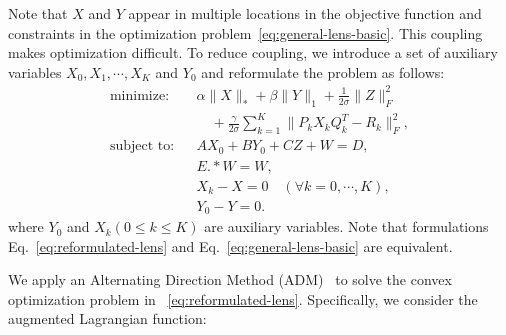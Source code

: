  Note that $X$ and $Y$ appear in
multiple locations in the objective function and constraints in the
optimization problem~\ref{eq:general-lens-basic}. This coupling makes
optimization difficult. To reduce coupling, we introduce a set of
auxiliary variables $X_0,X_1,\cdots,X_{K}$ and $Y_0$ and reformulate
the problem as follows:
\begin{eqnarray}
\text{minimize:}  && \alpha \|X\|_* + \beta \|Y\|_1 +
\frac{1}{2\sigma}\|Z\|_F^2 \nonumber\\
                  && \quad+\frac{\gamma}{2\sigma}\sum_{k=1}^K\|P_k X_k Q_k^T - R_k\|_F^2, \nonumber\\
\text{subject to:}&& AX_0 + BY_0 + CZ + W = D, \nonumber\\
&& E.*W = W, \nonumber\\
&& X_k - X = 0\quad (\forall k=0,\cdots,K\nonumber),\\
&& Y_0 - Y = 0.
\label{eq:reformulated-lens}
\end{eqnarray}
where $Y_0$ and $X_{k} (0\leq k \leq K)$ are auxiliary variables.
Note that formulations Eq.~\eqref{eq:reformulated-lens} and
Eq.~\eqref{eq:general-lens-basic} are equivalent.


 We apply an Alternating Direction
Method (ADM)~\cite{adm} to solve the convex optimization problem in
~\eqref{eq:reformulated-lens}.  Specifically, we consider the
augmented Lagrangian function:

